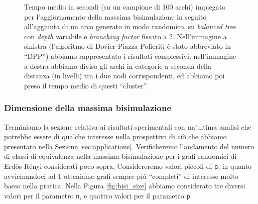 \begin{figure}[H]
\begin{subfigure}[t]{0.48\textwidth}
    \end{subfigure}
    \caption{Tempo medio in secondi (su un campione di 100 archi) impiegato per l'aggiornamento della massima bisimulazione in seguito all'aggiunta di un arco generato in modo randomico, su \emph{balanced tree} con \emph{depth} variabile e \emph{branching factor} fissato a 2. Nell'immagine a sinistra (l'algoritmo di Dovier-Piazza-Policriti è stato abbreviato in ``DPP'') abbiamo rappresentato i risultati complessivi, nell'immagine a destra abbiamo diviso gli archi in categorie a seconda della distanza (in livelli) tra i due nodi corrispondenti, ed abbiamo poi preso il tempo medio di questi ``cluster''.}
    \label{fig:saha_results_tree}
\end{figure}

\subsubsection{Dimensione della massima bisimulazione}
Terminiamo la sezione relativa ai risultati sperimentali con un'ultima analisi che potrebbe essere di qualche interesse nella prospettiva di ciò che abbiamo presentato nella Sezione \ref{sec:applications}. Verificheremo l'andamento del numero di classi di equivalenza nella massima bisimulazione per i grafi randomici di Erdős-Rényi considerati poco sopra. Considereremo valori piccoli di \verb|p|, in quanto avvicinandoci ad 1 otteniamo grafi sempre più ``completi'' di interesse molto basso nella pratica. Nella Figura \ref{fig:bisi_size} abbiamo considerato tre diversi valori per il parametro \verb|n|, e quattro valori per il parametro \verb|p|.

